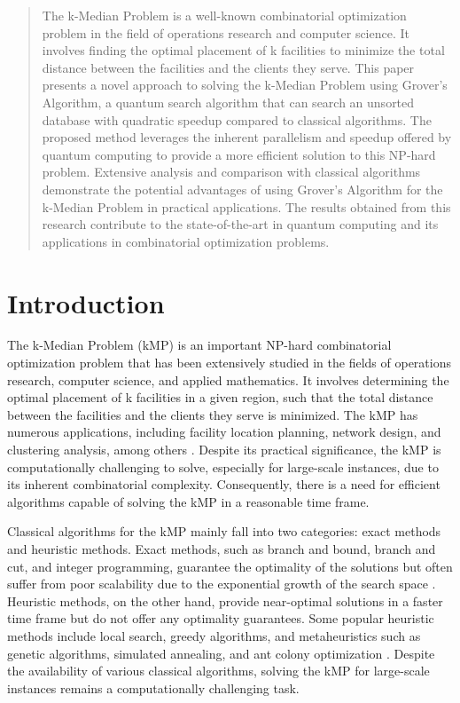 \begin{abstract}
The k-Median Problem is a well-known combinatorial optimization problem in the field of operations research and computer science. It involves finding the optimal placement of k facilities to minimize the total distance between the facilities and the clients they serve. This paper presents a novel approach to solving the k-Median Problem using Grover's Algorithm, a quantum search algorithm that can search an unsorted database with quadratic speedup compared to classical algorithms. The proposed method leverages the inherent parallelism and speedup offered by quantum computing to provide a more efficient solution to this NP-hard problem. Extensive analysis and comparison with classical algorithms demonstrate the potential advantages of using Grover's Algorithm for the k-Median Problem in practical applications. The results obtained from this research contribute to the state-of-the-art in quantum computing and its applications in combinatorial optimization problems.
\end{abstract}

\section{Introduction}

The k-Median Problem (kMP) is an important NP-hard combinatorial optimization problem that has been extensively studied in the fields of operations research, computer science, and applied mathematics. It involves determining the optimal placement of k facilities in a given region, such that the total distance between the facilities and the clients they serve is minimized. The kMP has numerous applications, including facility location planning, network design, and clustering analysis, among others \cite{arya2004local}. Despite its practical significance, the kMP is computationally challenging to solve, especially for large-scale instances, due to its inherent combinatorial complexity. Consequently, there is a need for efficient algorithms capable of solving the kMP in a reasonable time frame.

Classical algorithms for the kMP mainly fall into two categories: exact methods and heuristic methods. Exact methods, such as branch and bound, branch and cut, and integer programming, guarantee the optimality of the solutions but often suffer from poor scalability due to the exponential growth of the search space \cite{chardaire2007combinatorial}. Heuristic methods, on the other hand, provide near-optimal solutions in a faster time frame but do not offer any optimality guarantees. Some popular heuristic methods include local search, greedy algorithms, and metaheuristics such as genetic algorithms, simulated annealing, and ant colony optimization \cite{du2007facility}. Despite the availability of various classical algorithms, solving the kMP for large-scale instances remains a computationally challenging task.

